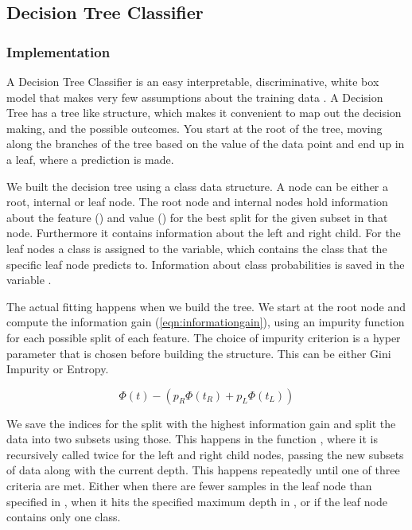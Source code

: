 \documentclass[../main.tex]{subfiles}
\begin{document}
\subsection{Decision Tree Classifier}

\subsubsection{Implementation}

A Decision Tree Classifier is an easy interpretable, 
discriminative, white box model that makes very few assumptions 
about the training 
data \autocite{geronHandsOn}. A Decision Tree has a tree like 
structure, which makes it convenient to map out the decision 
making, and the possible outcomes. You start at the root of the 
tree, moving along the branches of the tree based on the value of 
the data point and end up in a leaf, where a prediction is made.

We built the decision tree using a  class data 
structure. A node can be either a root, internal or leaf node. 
The root node and internal nodes hold information about the 
feature () and value 
() for the best split for the given 
subset in that node. 
Furthermore it contains information about the left and right 
child. 
For the leaf nodes a class is assigned 
to the  variable, which contains 
the class that the specific leaf node predicts to.
Information about class probabilities is saved in the variable 
.

The actual fitting happens when we build the tree.
We start at the root node and compute the information gain 
(\autoref{eqn:informationgain}), using an impurity function for 
each possible split of each feature. The choice of impurity 
criterion is a hyper parameter that is chosen before building the 
structure. This can be either Gini Impurity or Entropy.

\begin{equation}
\label{eqn:informationgain}
\Phi (t) -(p_R \Phi (t_R) + p_L \Phi (t_L))
\end{equation}

We save the indices for the split with the highest information 
gain and split the data into two subsets using those. This 
happens in the function , where it is 
recursively called twice for the left and right child nodes, 
passing the new subsets of data along with the current depth. 
This happens repeatedly until one of three criteria are met. 
Either when there are fewer samples in the leaf node than 
specified in , when it hits 
the specified maximum depth in , or if 
the leaf node contains only one class.
\end{document}
